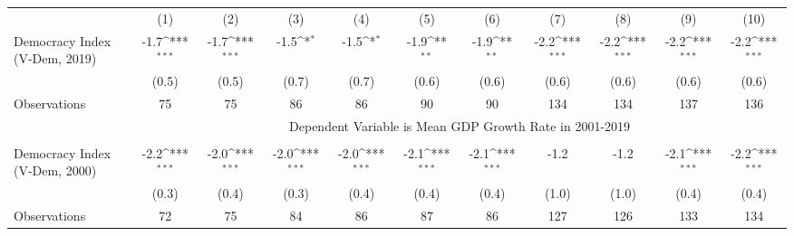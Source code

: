 {
\def\sym#1{\ifmmode^{#1}\else\(^{#1}\)\fi}
\begin{tabular}{l*{10}{c}}
\hline\hline
&\multicolumn{1}{c}{(1)}         &\multicolumn{1}{c}{(2)}         &\multicolumn{1}{c}{(3)}         &\multicolumn{1}{c}{(4)}         &\multicolumn{1}{c}{(5)}         &\multicolumn{1}{c}{(6)}         &\multicolumn{1}{c}{(7)}         &\multicolumn{1}{c}{(8)}         &\multicolumn{1}{c}{(9)}         &\multicolumn{1}{c}{(10)}         \\

Democracy Index (V-Dem, 2019)&        -1.7\sym{***}&        -1.7\sym{***}&        -1.5\sym{*}  &        -1.5\sym{*}  &        -1.9\sym{**} &        -1.9\sym{**} &        -2.2\sym{***}&        -2.2\sym{***}&        -2.2\sym{***}&        -2.2\sym{***}\\
&       (0.5)         &       (0.5)         &       (0.7)         &       (0.7)         &       (0.6)         &       (0.6)         &       (0.6)         &       (0.6)         &       (0.6)         &       (0.6)         \\

Observations        &          75         &          75         &          86         &          86         &          90         &          90         &         134         &         134         &         137         &         136         \\

& \multicolumn{10}{c}{Dependent Variable is Mean GDP Growth Rate in 2001-2019} \\\cline{2-11}\\[-1.8ex]
Democracy Index (V-Dem, 2000)&        -2.2\sym{***}&        -2.0\sym{***}&        -2.0\sym{***}&        -2.0\sym{***}&        -2.1\sym{***}&        -2.1\sym{***}&        -1.2         &        -1.2         &        -2.1\sym{***}&        -2.2\sym{***}\\
&       (0.3)         &       (0.4)         &       (0.3)         &       (0.4)         &       (0.4)         &       (0.4)         &       (1.0)         &       (1.0)         &       (0.4)         &       (0.4)         \\
\hline
Observations        &          72         &          75         &          84         &          86         &          87         &          86         &         127         &         126         &         133         &         134         \\


\end{tabular}}
